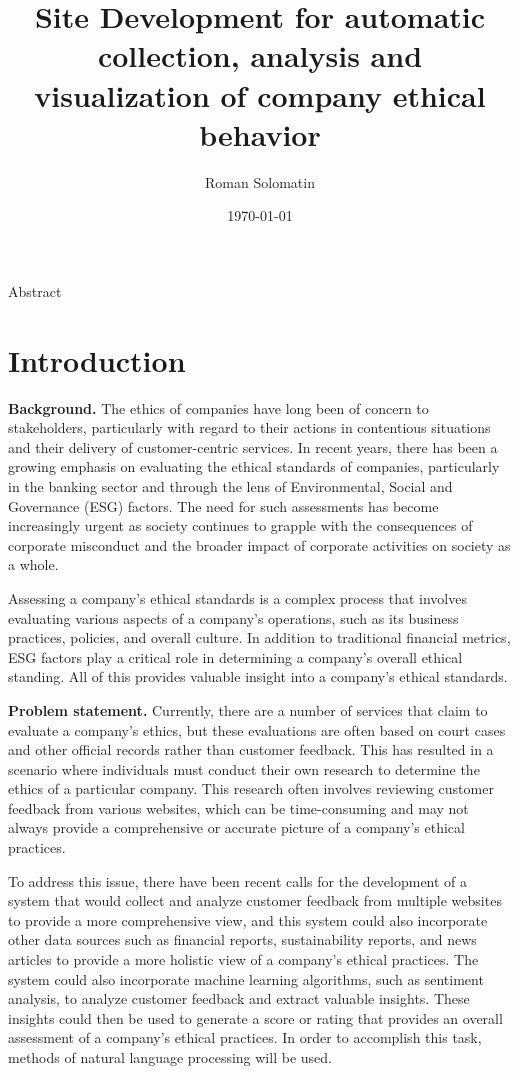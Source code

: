 \documentclass[PI]{ProjectProposal}
\author{Roman Solomatin}
\date{\today}
\title{Site Development for automatic collection, analysis and visualization of company ethical behavior}
\begin{document}
\maketitle
Abstract

\chapter{Introduction}
\label{sec:orgbaea490}
\textbf{Background.} The ethics of companies have long been of concern to stakeholders, particularly with regard to their actions in contentious situations and their delivery of customer-centric services. In recent years, there has been a growing emphasis on evaluating the ethical standards of companies, particularly in the banking sector and through the lens of Environmental, Social and Governance (ESG) factors\autocites{mure_esg_2021}[][]{miralles-quiros_esg_2019}[][]{climent_ethical_2018}. The need for such assessments has become increasingly urgent as society continues to grapple with the consequences of corporate misconduct and the broader impact of corporate activities on society as a whole.

Assessing a company's ethical standards is a complex process that involves evaluating various aspects of a company's operations, such as its business practices, policies, and overall culture. In addition to traditional financial metrics, ESG factors play a critical role in determining a company's overall ethical standing. All of this provides valuable insight into a company's ethical standards.

\textbf{Problem statement.} Currently, there are a number of services that claim to evaluate a company's ethics, but these evaluations are often based on court cases and other official records rather than customer feedback. This has resulted in a scenario where individuals must conduct their own research to determine the ethics of a particular company. This research often involves reviewing customer feedback from various websites, which can be time-consuming and may not always provide a comprehensive or accurate picture of a company's ethical practices.

To address this issue, there have been recent calls for the development of a system that would collect and analyze customer feedback from multiple websites to provide a more comprehensive view, and this system could also incorporate other data sources such as financial reports, sustainability reports, and news articles to provide a more holistic view of a company's ethical practices. The system could also incorporate machine learning algorithms, such as sentiment analysis, to analyze customer feedback and extract valuable insights. These insights could then be used to generate a score or rating that provides an overall assessment of a company's ethical practices. In order to accomplish this task, methods of natural language processing will be used.
\end{document}
